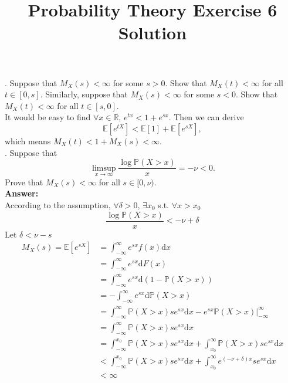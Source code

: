 \documentclass[onecolumn, 12pt]{IEEEtran}
\title{Probability Theory Exercise 6 Solution}
\newcommand{\dd}{\mathrm{d}}
\begin{document}
\maketitle
{}. Suppose that $M_X(s) < \infty$ for some $s > 0$. Show that $M_X(t) < \infty$ for all $t \in [0, s]$.
Similarly, suppose
that $M_X(s) < \infty$ for some $s < 0$. Show that $M_X(t) < \infty$ for all $t \in [s, 0]$.
\noindent
\vspace*{0.1in}\\
 It would be easy to find $\forall x \in \mathbb{R}$, $e^{tx}<1+e^{sx}$. Then we can derive
\begin{equation*}
\mathbb{E}[e^{tX}]<\mathbb{E}[1]+\mathbb{E}[e^{sX}],
\end{equation*}
which means $M_X(t)<1+M_X(s)<\infty$.
\noindent 
\vspace*{0.3in}\\
. Suppose that
\begin{equation*}
\limsup_{x \rightarrow \infty}\frac{\log \mathbb{P}(X > x)}{x}=-\nu < 0.
\end{equation*}
Prove that $M_X(s) < \infty$ for all $s \in [0, \nu)$.
\noindent
\vspace*{0.1in}\\
\noindent
{\bf Answer:}\\According to the assumption, $\forall \delta >0$, $\exists x_0$ s.t. $\forall x>x_0$
\begin{equation*}
\frac{\log \mathbb{P}(X > x)}{x}<-\nu+\delta
\end{equation*}
Let $\delta < \nu-s$
\begin{equation*}
\begin{aligned}
M_X(s)=\mathbb{E}[e^{sX}]&=\int_{-\infty}^{\infty}e^{sx}f(x)\dd x\\
&=\int_{-\infty}^{\infty}e^{sx}\dd F(x)\\
&=\int_{-\infty}^{\infty}e^{sx}\dd (1-\mathbb{P}(X>x))\\
&=-\int_{-\infty}^{\infty}e^{sx}\dd\mathbb{P}(X>x)\\
&=\int_{-\infty}^{\infty}\mathbb{P}(X>x)se^{sx}\dd x-\left.e^{sx}\mathbb{P}(X>x)\right|_{-\infty}^{\infty}\\
&=\int_{-\infty}^{\infty}\mathbb{P}(X>x)se^{sx}\dd x\\
&=\int_{-\infty}^{x_0}\mathbb{P}(X>x)se^{sx}\dd x+\int_{x_0}^{\infty}\mathbb{P}(X>x)se^{sx}\dd x\\
&<\int_{-\infty}^{x_0}\mathbb{P}(X>x)se^{sx}\dd x+\int_{x_0}^{\infty}e^{(-\nu+\delta)x}se^{sx}\dd x\\
&<\infty
\end{aligned}
\end{equation*}
\noindent
\vspace*{0.3in}
\end{document}
